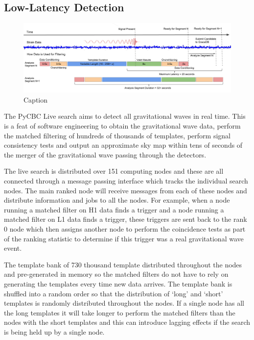 \subsection{\label{2:sec:low-latency-detection}Low-Latency Detection}
%
\begin{figure}
    \centering
    \includegraphics[width=1.0\linewidth]{images/2_searches/live_latency_diagram.pdf}
    \caption{Caption}
    \label{2:fig:live_latency_diagram}
\end{figure}
%
The PyCBC Live search aims to detect all gravitational waves in real time. This is a feat of software engineering to obtain the gravitational wave data, perform the matched filtering of hundreds of thousands of templates, perform signal consistency tests and output an approximate sky map within tens of seconds of the merger of the gravitational wave passing through the detectors.

The live search is distributed over 151 computing nodes and these are all connected through a message passing interface which tracks the individual search nodes. The main ranked node will receive messages from each of these nodes and distribute information and jobs to all the nodes. For example, when a node running a matched filter on H1 data finds a trigger and a node running a matched filter on L1 data finds a trigger, these triggers are sent back to the rank 0 node which then assigns another node to perform the coincidence tests as part of the ranking statistic to determine if this trigger was a real gravitational wave event.

The template bank of 730 thousand template distributed throughout the nodes and pre-generated in memory so the matched filters do not have to rely on generating the templates every time new data arrives. The template bank is shuffled into a random order so that the distribution of `long' and `short' templates is randomly distributed throughout the nodes. If a single node has all the long templates it will take longer to perform the matched filters than the nodes with the short templates and this can introduce lagging effects if the search is being held up by a single node.

